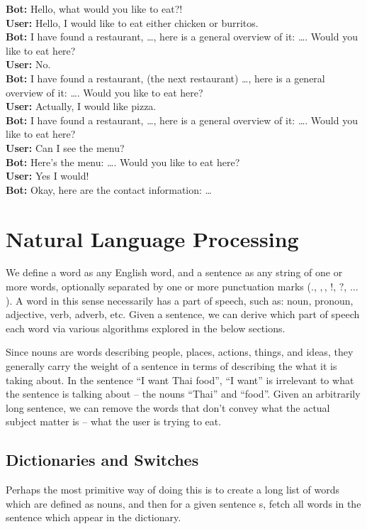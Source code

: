 \documentclass{article}
\begin{document}
    \textbf{Bot:} Hello, what would you like to eat?!\\
    \textbf{User:} Hello, I would like to eat either chicken or burritos.\\
    \textbf{Bot:} I have found a restaurant, \ldots, here is a general overview of it: \ldots. Would you like to eat here?\\
    \textbf{User:} No.\\
    \textbf{Bot:} I have found a restaurant, (the next restaurant) \ldots, here is a general overview of it: \ldots. Would you like to eat here?\\
    \textbf{User:} Actually, I would like pizza.\\
    \textbf{Bot:} I have found a restaurant, \ldots, here is a general overview of it: \ldots. Would you like to eat here?\\
    \textbf{User:} Can I see the menu?\\
    \textbf{Bot:} Here's the menu: \ldots. Would you like to eat here?\\
    \textbf{User:} Yes I would!\\
    \textbf{Bot:} Okay, here are the contact information: \ldots\\
    

\section{Natural Language Processing}
        We define a word as any English word, and a sentence as any string of one or more words, optionally separated by one or more punctuation marks ($.$, $,$, $!$, $?$, $\ldots$). A word in this sense necessarily has a part of speech, such as: noun, pronoun, adjective, verb, adverb, etc. Given a sentence, we can derive which part of speech each word via various algorithms explored in the below sections.

        Since nouns are words describing people, places, actions, things, and ideas, they generally carry the weight of a sentence in terms of describing the what it is taking about. In the sentence “I want Thai food”, “I want” is irrelevant to what the sentence is talking about -- the nouns “Thai” and “food”. Given an arbitrarily long sentence, we can remove the words that don't convey what the actual subject matter is -- what the user is trying to eat.

    \subsection{Dictionaries and Switches}
        Perhaps the most primitive way of doing this is to create a long list of words which are defined as nouns, and then for a given sentence s, fetch all words in the sentence which appear in the dictionary.
\end{document}
